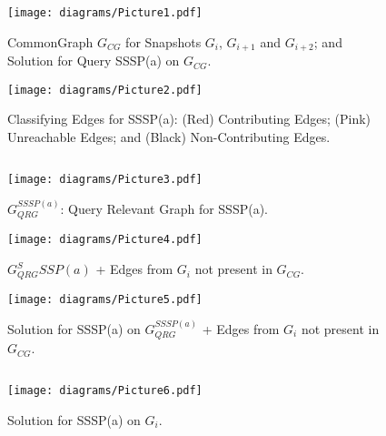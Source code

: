 \begin{figure}[!t]
    \centering
    \texttt{[image: diagrams/Picture1.pdf]}
    \caption{CommonGraph $G_{CG}$ for Snapshots $G_i$, $G_{i+1}$ and $G_{i+2}$; and Solution for Query SSSP(a) on $G_{CG}$.}
    \label{fig1}
\end{figure}

\begin{figure*}[!t]
    \begin{minipage}{3.25in}
    \texttt{[image: diagrams/Picture2.pdf]}
    \caption{Classifying Edges for SSSP(a): (Red) Contributing Edges; (Pink) Unreachable Edges; and (Black) Non-Contributing Edges.}
    \label{fig2}
    \end{minipage}
    \begin{minipage}{0.2in}
    $\;\;$
    \end{minipage}
    \begin{minipage}{3.25in}   
    \texttt{[image: diagrams/Picture3.pdf]}
    \vspace{0.15in}
    \caption{$G_{QRG}^{SSSP(a)}$: Query Relevant Graph for SSSP(a).}
    \label{fig3}
    \end{minipage}
\end{figure*}

\begin{figure}[!t]
    \centering
    \texttt{[image: diagrams/Picture4.pdf]}
    \caption{$G_{QRG}^SSSP(a)$ + Edges from $G_i$ not present in $G_{CG}$.}
    \label{fig4}
\end{figure}


\begin{figure*}[!t]
    \begin{minipage}{3.25in}
    \texttt{[image: diagrams/Picture5.pdf]}
    \caption{Solution for SSSP(a) on $G_{QRG}^{SSSP(a)}$ + Edges from $G_i$ not present in $G_{CG}$.}
    \label{fig5}
    \end{minipage}
    \begin{minipage}{0.2in}
    $\;\;$
    \end{minipage}
    \begin{minipage}{3.25in}   
    \texttt{[image: diagrams/Picture6.pdf]}
    \vspace{0.15in}
    \caption{Solution for SSSP(a) on $G_i$.}
    \label{fig6}
    \end{minipage}
\end{figure*}






